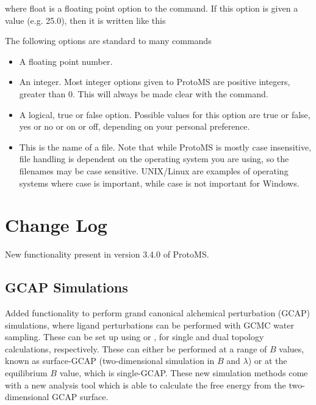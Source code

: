 \documentclass[letterpaper,10pt,english]{sphinxmanual}
\begin{document}
where float is a floating point option to the command. If this option is given a value (e.g. 25.0), then it is written like this

%
\begin{sphinxVerbatim}[commandchars=\\\{\}]
 
\end{sphinxVerbatim}

The following options are standard to many commands
\begin{itemize}
\item {} 
 A floating point number.

\item {} 
 An integer. Most integer options given to ProtoMS are positive integers, greater than 0. This will always be made clear with the command.

\item {} 
 A logical, true or false option. Possible values for this option are true or false, yes or no or on or off, depending on your personal preference.

\item {} 
 This is the name of a file. Note that while ProtoMS is mostly case insensitive, file handling is dependent on the operating system you are using, so the filenames may be case sensitive. UNIX/Linux are examples of operating systems where case is important, while case is not important for Windows.

\end{itemize}


\chapter{Change Log}
\label{\detokenize{changelog::doc}}\label{\detokenize{changelog:change-log}}
New functionality present in version 3.4.0 of ProtoMS.


\section{GCAP Simulations}
\label{\detokenize{changelog:gcap-simulations}}
Added functionality to perform grand canonical alchemical perturbation (GCAP) simulations, where ligand perturbations can be performed with GCMC water sampling. These can be set up using  or , for single and dual topology calculations, respectively. These can either be performed at a range of \(B\) values, known as surface-GCAP (two-dimensional simulation in \(B\) and \(\lambda\)) or at the equilibrium \(B\) value, which is single-GCAP. These new simulation methods come with a new analysis tool  which is able to calculate the free energy from the two-dimensional GCAP surface.
\end{document}
